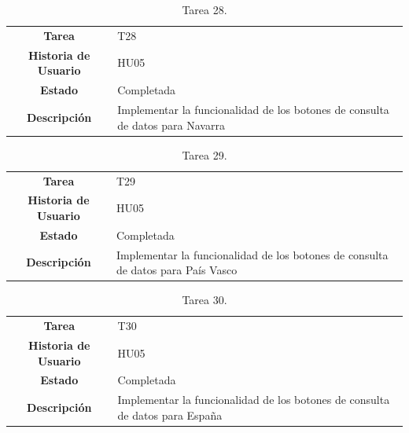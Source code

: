 \begin{table}[H]
	\begin{center}
		\begin{tabular}{| c | p{9cm} |}
			\hline
			
			\textbf{Tarea} & T28 \\
			\textbf{Historia de Usuario} & HU05 \\
			\textbf{Estado} & Completada \\
			\textbf{Descripción} & Implementar la funcionalidad de los botones de consulta de datos para Navarra \\ \hline
		\end{tabular}
		\caption{Tarea 28.}
	\end{center}
\end{table}

\begin{table}[H]
	\begin{center}
		\begin{tabular}{| c | p{9cm} |}
			\hline
			
			\textbf{Tarea} & T29 \\
			\textbf{Historia de Usuario} & HU05 \\
			\textbf{Estado} & Completada \\
			\textbf{Descripción} & Implementar la funcionalidad de los botones de consulta de datos para País Vasco \\ \hline
		\end{tabular}
		\caption{Tarea 29.}
	\end{center}
\end{table}

\begin{table}[H]
	\begin{center}
		\begin{tabular}{| c | p{9cm} |}
			\hline
			
			\textbf{Tarea} & T30 \\
			\textbf{Historia de Usuario} & HU05 \\
			\textbf{Estado} & Completada \\
			\textbf{Descripción} & Implementar la funcionalidad de los botones de consulta de datos para España \\ \hline
		\end{tabular}
		\caption{Tarea 30.}
	\end{center}
\end{table}

